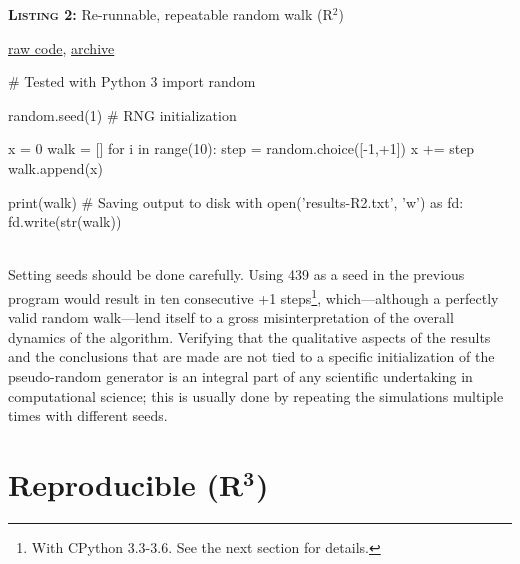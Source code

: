 \documentclass[a4paper,11pt]{article}
\begin{document}
\noindent \begin{minipage}[c]{\linewidth}
\begin{code}{\parbox{.8\textwidth}{\textbf{\textsc{Listing 2:}} Re-runnable, repeatable random walk (R$^2$)}\parbox{.161\textwidth}{\hfill \href{https://raw.githubusercontent.com/rougier/random-walk/frontiers/random-walk-R2.py}{raw code}, \href{https://doi.org/10.5281/zenodo.848217}{archive}}}
# Tested with Python 3
import random

random.seed(1) # RNG initialization

x =  0
walk = []
for i in range(10):
    step = random.choice([-1,+1])
    x += step
    walk.append(x)

print(walk)
# Saving output to disk
with open('results-R2.txt', 'w') as fd:
    fd.write(str(walk))
\end{code}
\end{minipage}\\

Setting seeds should be done carefully. Using 439 as a seed in the previous program would result in ten consecutive +1 steps\footnote{With CPython 3.3-3.6. See the next section for details.}, which---although a perfectly valid random walk---lend itself to a gross misinterpretation of the overall dynamics of the algorithm. Verifying that the qualitative aspects of the results and the conclusions that are made are not tied to a specific initialization of the pseudo-random generator is an integral part of any scientific undertaking in computational science;
this is usually done by repeating the simulations multiple times with different seeds.



\section*{Reproducible (R$^{\mathbf 3}$)}
\end{document}
